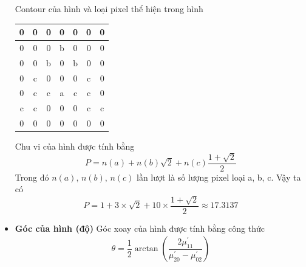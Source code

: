 \begin{itemize}
                    \hspace*{0.6cm}Contour của hình và loại pixel thể hiện trong hình
                    \begin{table}[h]
                         \centering
                         \begin{tabular}{|c|c|c|c|c|c|c|}
                         \hline
                         0 & 0 & 0 & 0 & 0 & 0 & 0 \\ \hline
                         0 & 0 & 0 & b & 0 & 0 & 0 \\ \hline
                         0 & 0 & b & 0 & b & 0 & 0 \\ \hline
                         0 & c & 0 & 0 & 0 & c & 0 \\ \hline
                         0 & c & c & a & c & c & 0 \\ \hline
                         c & c & 0 & 0 & 0 & c & c \\ \hline
                         0 & 0 & 0 & 0 & 0 & 0 & 0 \\ \hline
                         \end{tabular}
                    \end{table}
                    \newline
                    \hspace*{0.6cm}Chu vi của hình được tính bằng
                    \begin{equation*}
                         P = n(a) + n(b)\sqrt{2} + n(c) \dfrac{1+\sqrt{2}}{2}
                    \end{equation*}
                    \hspace*{0.6cm}Trong đó $n(a), \, n(b), \, n(c)$ lần lượt là số lượng pixel loại a, b, c.
                    \newline
                    \hspace*{0.6cm}Vậy ta có
                    \begin{equation*}
                         P = 1 + 3 \times \sqrt{2} + 10 \times \dfrac{1+\sqrt{2}}{2} \approx 17.3137
                    \end{equation*}
                    \item \textbf{Góc của hình (độ)}
                    \newline
                    \hspace*{0.6cm}Góc xoay của hình được tính bằng công thức
                    \begin{align}
                         \theta = \dfrac{1}{2} \arctan \left( \dfrac{2 \mu_{11}^{'}}{\mu_{20}^{'} - \mu_{02}^{'}} \right)

\end{align}
\end{itemize}
